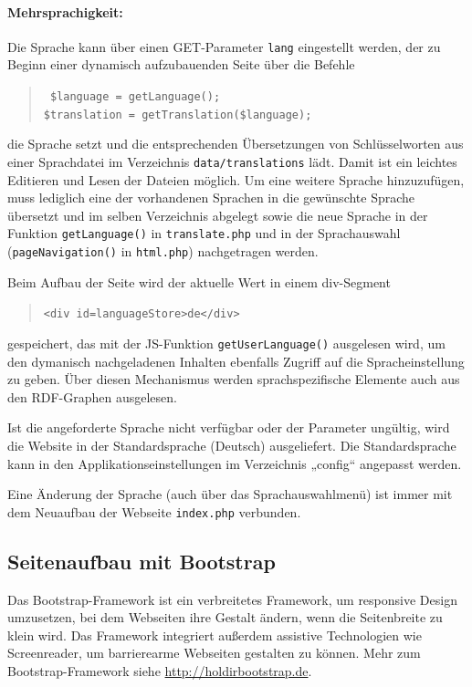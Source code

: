 \documentclass[11pt,a4paper]{article}
\begin{document}
\paragraph{Mehrsprachigkeit:}
Die Sprache kann über einen GET-Parameter \texttt{lang} eingestellt werden, der
zu Beginn einer dynamisch aufzubauenden Seite über die Befehle     
\begin{quote}\tt
  \$language = getLanguage();\\
  \$translation = getTranslation(\$language);
\end{quote}
die Sprache setzt und die entsprechenden Übersetzungen von Schlüsselworten aus
einer Sprachdatei im Verzeichnis \texttt{data/translations} lädt.  Damit ist
ein leichtes Editieren und Lesen der Dateien möglich. Um eine weitere Sprache
hinzuzufügen, muss lediglich eine der vorhandenen Sprachen in die gewünschte
Sprache übersetzt und im selben Verzeichnis abgelegt sowie die neue Sprache in
der Funktion \texttt{getLanguage()} in \texttt{translate.php} und in der
Sprachauswahl (\texttt{pageNavigation()} in \texttt{html.php}) nachgetragen
werden.

Beim Aufbau der Seite wird der aktuelle Wert in einem div-Segment 
\begin{quote}
  \texttt{<div id={\dq}languageStore{\dq}>de</div>}
\end{quote}
gespeichert, das mit der JS-Funktion \texttt{getUserLanguage()} ausgelesen
wird, um den dymanisch nachgeladenen Inhalten ebenfalls Zugriff auf die
Spracheinstellung zu geben.  Über diesen Mechanismus werden sprachspezifische
Elemente auch aus den RDF-Graphen ausgelesen.

Ist die angeforderte Sprache nicht verfügbar oder der Parameter ungültig, wird
die Website in der Standardsprache (Deutsch) ausgeliefert. Die Standardsprache
kann in den Applikationseinstellungen im Verzeichnis „config“ angepasst werden.

Eine Änderung der Sprache (auch über das Sprachauswahlmenü) ist immer mit dem
Neuaufbau der Webseite \texttt{index.php} verbunden. 

\subsection{Seitenaufbau mit Bootstrap}

Das Bootstrap-Framework ist ein verbreitetes Framework, um responsive Design
umzusetzen, bei dem Webseiten ihre Gestalt ändern, wenn die Seitenbreite zu
klein wird.  Das Framework integriert außerdem assistive Technologien wie
Screenreader, um barrierearme Webseiten gestalten zu können.  Mehr zum
Bootstrap-Framework siehe \url{http://holdirbootstrap.de}.
\end{document}
